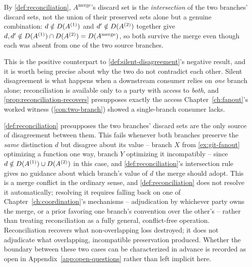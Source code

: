 \begin{proofsketch}
By \cref{def:reconciliation}, $A^{\mathrm{merge}}$'s discard set is the
\emph{intersection} of the two branches' discard sets, not the union of
their preserved sets alone but a genuine combination: $d \notin
D(A^{(1)})$ and $d' \notin D(A^{(2)})$ together give $d,
d' \notin D(A^{(1)}) \cap D(A^{(2)}) = D(A^{\mathrm{merge}})$,
so both survive the merge even though each was absent from one of the
two source branches.
\end{proofsketch}

This is the positive counterpart to \cref{def:silent-disagreement}'s
negative result, and it is worth being precise about why the two do not
contradict each other. Silent disagreement is what happens when a
downstream consumer relies on \emph{one} branch alone; reconciliation is
available only to a party with access to \emph{both}, and
\cref{prop:reconciliation-recovers} presupposes exactly the access
Chapter~\ref{ch:fanout}'s worked witness (\cref{con:two-branch}) showed a
single-branch consumer lacks.

\begin{remark}
\label{rem:reconciliation-conflict}
\cref{def:reconciliation} presupposes the two branches' discard sets are
the only source of disagreement between them. This fails whenever both
branches preserve the \emph{same} distinction $d$ but disagree about its
value -- branch $X$ from \cref{ex:git-fanout} optimizing a function one
way, branch $Y$ optimizing it incompatibly -- since $d \notin
D(A^{(1)}) \cup D(A^{(2)})$ in this case, and
\cref{def:reconciliation}'s intersection rule gives no guidance about
which branch's value of $d$ the merge should adopt. This is a merge
conflict in the ordinary sense, and \cref{def:reconciliation} does not
resolve it automatically; resolving it requires falling back on one of
Chapter~\ref{ch:coordination}'s mechanisms -- adjudication by whichever
party owns the merge, or a prior favoring one branch's convention over
the other's -- rather than treating reconciliation as a fully general,
conflict-free operation. Reconciliation recovers what non-overlapping
loss destroyed; it does not adjudicate what overlapping, incompatible
preservation produced. Whether the boundary between these two cases can
be characterized in advance is recorded as open in
Appendix~\ref{app:open-questions} rather than left implicit here.
\end{remark}

